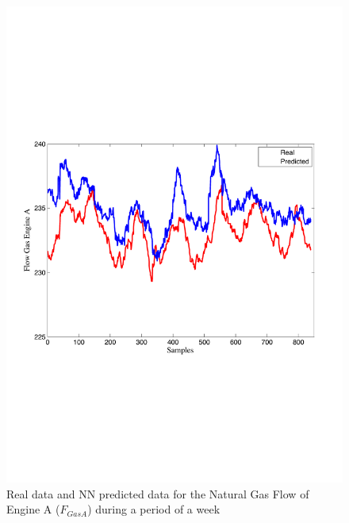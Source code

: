 \begin{figure}
\includegraphics[width=1\textwidth]{nna1bis.pdf}
\caption{Real data and NN predicted data for the Natural Gas Flow  of Engine A ($F_{GasA}$) during a period of a week}
\label{FengineA}
\end{figure}

